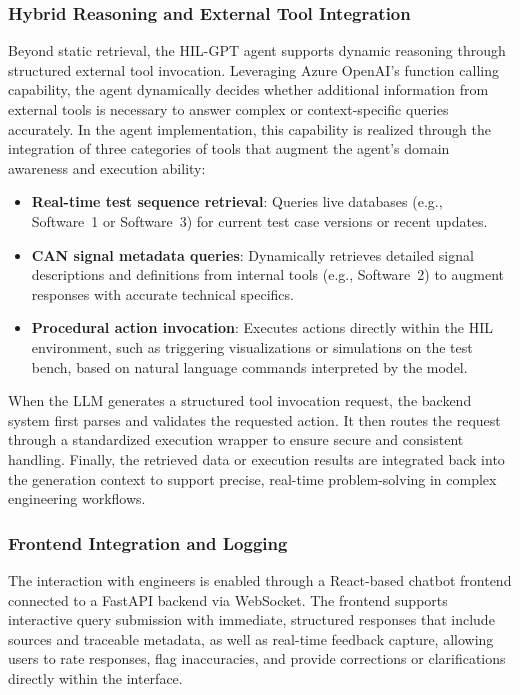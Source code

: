\documentclass[a4paper,fleqn]{cas-dc}
\renewcommand{\textit}[1]{#1}
\begin{document}
\subsubsection{Hybrid Reasoning and External Tool Integration}
Beyond static retrieval, the HIL-GPT agent supports dynamic reasoning through structured external tool invocation. Leveraging Azure OpenAI’s function calling capability, the agent dynamically decides whether additional information from external tools is necessary to answer complex or context-specific queries accurately. In the agent implementation, this capability is realized through the integration of three categories of tools that augment the agent’s domain awareness and execution ability:
\begin{itemize}
    \item \textbf{Real-time test sequence retrieval}: Queries live databases (e.g., \textit{Software~1} or \textit{Software~3}) for current test case versions or recent updates.
    \item \textbf{CAN signal metadata queries}: Dynamically retrieves detailed signal descriptions and definitions from internal tools (e.g., \textit{Software~2}) to augment responses with accurate technical specifics.
    \item \textbf{Procedural action invocation}: Executes actions directly within the HIL environment, such as triggering visualizations or simulations on the test bench, based on natural language commands interpreted by the model.
\end{itemize}

When the LLM generates a structured tool invocation request, the backend system first parses and validates the requested action. It then routes the request through a standardized execution wrapper to ensure secure and consistent handling. Finally, the retrieved data or execution results are integrated back into the generation context to support precise, real-time problem-solving in complex engineering workflows.

\subsubsection{Frontend Integration and Logging}
The interaction with engineers is enabled through a React-based chatbot frontend connected to a FastAPI backend via WebSocket. The frontend supports interactive query submission with immediate, structured responses that include sources and traceable metadata, as well as real-time feedback capture, allowing users to rate responses, flag inaccuracies, and provide corrections or clarifications directly within the interface. 
\end{document}
